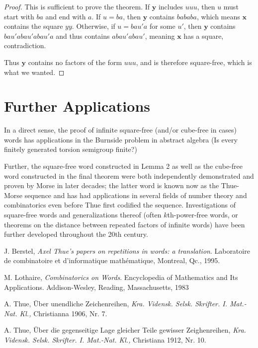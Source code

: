 \documentclass[letterpaper,12pt]{article}
\newcommand{\bl}[1]{\mathbf{#1}}
\begin{document}
\begin{proof}
This is sufficient to prove the theorem. If $\bl{y}$ includes $uuu$, then $u$ must start with $ba$ and end with $a$. If $u = ba$, then $\bl{y}$ contains $bababa$, which means $\bl{x}$ contains the square $yy$. Otherwise, if $u = bau'a$ for some $u'$, then $\bl{y}$ contains $bau'abau'abau'a$ and thus contains $abau'abau'$, meaning $\bl{x}$ has a square, contradiction.

Thus $\bl{y}$ contains no factors of the form $uuu$, and is therefore square-free, which is what we wanted.

\end{proof}

\section{Further Applications}

In a direct sense, the proof of infinite square-free (and/or cube-free in cases) words has applications in the Burnside problem in abstract algebra (Is every finitely generated torsion semigroup finite?)\cite{lothaire}

Further, the square-free word constructed in Lemma 2 as well as the cube-free word constructed in the final theorem were both independently demonstrated and proven by Morse in later decades; the latter word is known now as the Thue-Morse sequence and has had applications in several fields of number theory and combinatorics even before Thue first codified the sequence. Investigations of square-free words and generalizations thereof (often $k$th-power-free words, or theorems on the distance between repeated factors of infinite words) have been further developed throughout the 20th century.

\begin{thebibliography}{9}

	J. Berstel,
	\emph{Axel Thue's papers on repetitions in words: a translation}.
	Laboratoire de combinatoire et d'informatique math\'ematique, Montreal, Qc.,
	1995.

	M. Lothaire,
	\emph{Combinatorics on Words}.
	Encyclopedia of Mathematics and Its Applications.
	Addison-Wesley, Reading, Massachusetts,
	1983

	A. Thue,
	\"Uber unendliche Zeichenreihen,
	\emph{Kra. Vidensk. Selsk. Skrifter. I.
	Mat.-Nat. Kl.,}
	Christianna 1906, Nr. 7.

	A. Thue,
	\"Uber die gegenseitige Lage gleicher Teile gewisser Zeighenreihen,
	\emph{Kra. Vidensk. Selsk. Skrifter. I.
	Mat.-Nat. Kl.,}
	Christiana 1912, Nr. 10.

\end{thebibliography}
\end{document}
